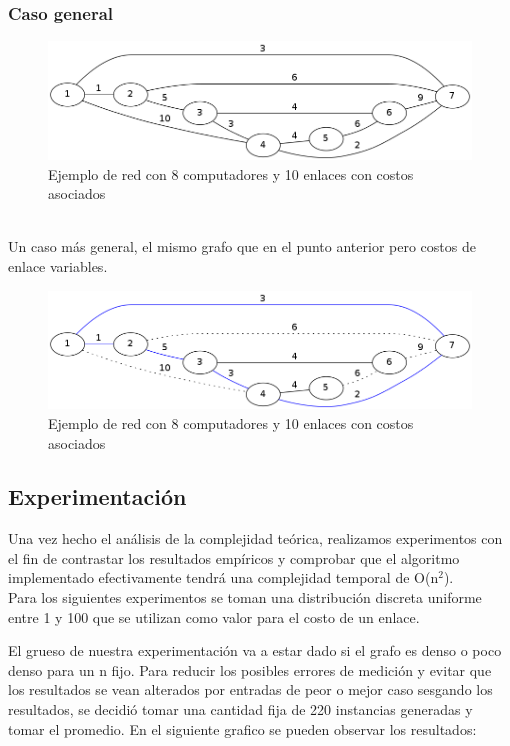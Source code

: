 \subsubsection{Caso general}
\begin{figure}[h]
  \centering
    \includegraphics[scale=0.45]{ej3/caso4-1.png}
  \caption{Ejemplo de red con 8 computadores y 10 enlaces con costos asociados}
  \label{fig:ejemplo}
\end{figure}
~
\\
Un caso m\'as general, el mismo grafo que en el punto anterior pero costos de enlace variables.
\begin{figure}[h]
  \centering
    \includegraphics[scale=0.45]{ej3/caso4-2.png}
  \caption{Ejemplo de red con 8 computadores y 10 enlaces con costos asociados}
  \label{fig:ejemplo}
\end{figure}


\subsection{Experimentación}
Una vez hecho el análisis de la complejidad teórica, realizamos experimentos con el fin de contrastar los resultados empíricos y comprobar que el algoritmo implementado efectivamente tendrá una complejidad temporal de O(n$^{2}$).\\
Para los siguientes experimentos  se toman una distribución discreta uniforme entre 1 y 100 que se utilizan como valor para el costo de un enlace.

El grueso de nuestra experimentación va a estar dado si el grafo es denso o poco denso para un n fijo.
Para reducir los posibles errores de medición y evitar que los resultados se vean alterados por entradas de peor o mejor caso sesgando los resultados, se decidió tomar una cantidad fija de 220 instancias generadas y tomar el promedio. En el siguiente grafico se pueden observar los resultados:


